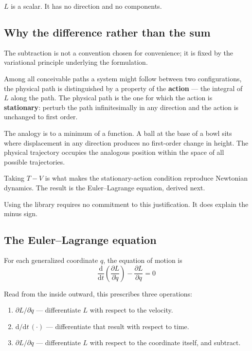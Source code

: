 \documentclass[11pt,a4paper]{article}
\newcommand{\ud}{\mathrm{d}}
\newcommand{\dd}[2]{\frac{\partial #1}{\partial #2}}
\newcommand{\ddt}[1]{\frac{\ud #1}{\ud t}}
\begin{document}
$L$ is a scalar. It has no direction and no components.

\subsection{Why the difference rather than the sum}
\label{sec:action}

The subtraction is not a convention chosen for convenience; it is fixed by the variational principle
underlying the formulation.

Among all conceivable paths a system might follow between two configurations, the physical path is
distinguished by a property of the \textbf{action} --- the integral of $L$ along the path. The
physical path is the one for which the action is \textbf{stationary}: perturb the path
infinitesimally in any direction and the action is unchanged to first order.

The analogy is to a minimum of a function. A ball at the base of a bowl sits where displacement in
any direction produces no first-order change in height. The physical trajectory occupies the
analogous position within the space of all possible trajectories.

Taking $T - V$ is what makes the stationary-action condition reproduce Newtonian dynamics. The
result is the Euler--Lagrange equation, derived next.

Using the library requires no commitment to this justification. It does explain the minus sign.

\subsection{The Euler--Lagrange equation}

For each generalized coordinate $q$, the equation of motion is
\begin{equation}
\ddt{}\left(\dd{L}{\dot q}\right) - \dd{L}{q} = 0
\label{eq:el}
\end{equation}

\noindent Read from the inside outward, this prescribes three operations:

\begin{enumerate}[leftmargin=1.8em,itemsep=0.25em]
  \item $\partial L/\partial \dot q$ --- differentiate $L$ with respect to the velocity.
  \item $\ud/\ud t\,(\cdot)$ --- differentiate that result with respect to time.
  \item $\partial L/\partial q$ --- differentiate $L$ with respect to the coordinate itself, and
        subtract.
\end{enumerate}
\end{document}

